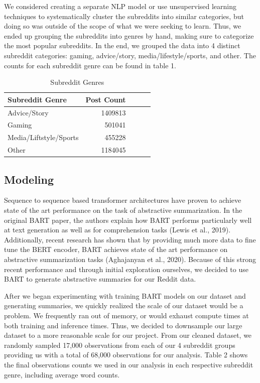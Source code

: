 \documentclass[11pt,a4paper, twocolumn]{article}
\begin{document}
We considered creating a separate NLP model or use unsupervised learning techniques to systematically cluster the subreddits into similar categories, 
but doing so was outside of the scope of what we were seeking to learn. 
Thus, we ended up grouping the subreddits into genres by hand, making sure to categorize the most popular subreddits. 
In the end, we grouped the data into 4 distinct subreddit categories: gaming, advice/story, media/lifestyle/sports, and other. 
The counts for each subreddit genre can be found in table 1.

\begin{table}[h]
  \centering
  \begin{tabular}{lrlll}
  \hline \textbf{Subreddit Genre} & \textbf{Post Count}\\ \hline
  Advice/Story & 1409813 \\
  Gaming & 501041 \\
  Media/Liftstyle/Sports & 455228 \\
  Other & 1184045 \\
  \hline
  \end{tabular}
  \caption{\label{font-table3} Subreddit Genres}
\end{table}


\subsection{Modeling}

Sequence to sequence based transformer architectures have proven to achieve state of the art performance on the task of abstractive summarization.
In the original BART paper, the authors explain how BART performs particularly well at text generation as well as for comprehension tasks (Lewis et al., 2019). 
Additionally, recent research has shown that by providing much more data to fine tune the BERT encoder, 
BART achieves state of the art performance on abstractive summarization tasks (Aghajanyan et al., 2020). 
Because of this strong recent performance and through initial exploration ourselves, 
we decided to use BART to generate abstractive summaries for our Reddit data. 

After we began experimenting with training BART models on our dataset and generating summaries, we quickly realized the scale of our dataset would be a problem. 
We frequently ran out of memory, or would exhaust compute times at both training and inference times. 
Thus, we decided to downsample our large dataset to a more reasonable scale for our project. 
From our cleaned dataset, we randomly sampled 17,000 observations from each of our 4 subreddit groups providing us with a total of 68,000 observations for our analysis. 
Table 2 shows the final observations counts we used in our analysis in each respective subreddit genre, including average word counts. 
\end{document}
